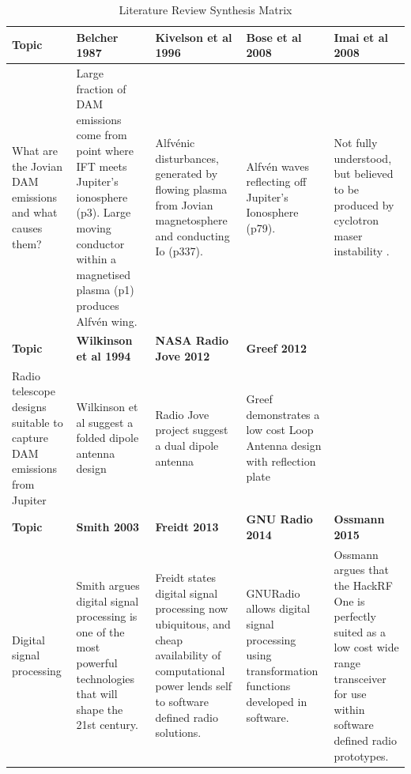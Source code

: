 %
\begin{table}
  \centering
  \begin{tabular}{ | p{2.5cm} || p{2.5cm} | p{2.5cm} | p{2.5cm} | p{2.5cm} |}
    \hline
    \textbf{Topic} & \textbf{Belcher 1987} & \textbf{Kivelson et al 1996} & \textbf{Bose et al 2008} & \textbf{Imai et al 2008} \\ \hline \hline
    What are the Jovian DAM emissions and what causes them? & Large fraction of DAM emissions come from point where IFT meets Jupiter's ionosphere (p3). Large moving conductor within a magnetised plasma (p1) produces Alfv\'en wing. & Alfv\'enic disturbances, generated by flowing plasma from Jovian magnetosphere and conducting Io (p337). & Alfv\'en waves reflecting off Jupiter's Ionosphere (p79). & Not fully understood, but believed to be produced by cyclotron maser instability \citep{imai-08}. \\ \hline \hline

    \textbf{Topic} & \textbf{Wilkinson et al 1994} & \textbf{NASA Radio Jove 2012} & \textbf{Greef 2012} &  \\ \hline \hline

    Radio telescope designs suitable to capture DAM emissions from Jupiter & Wilkinson et al suggest a folded dipole antenna design & Radio Jove project suggest a dual dipole antenna & Greef demonstrates a low cost Loop Antenna design with reflection plate & \\ \hline \hline
    
    \textbf{Topic} & \textbf{Smith 2003} & \textbf{Freidt 2013} & \textbf{GNU Radio 2014} & \textbf{Ossmann 2015} \\ \hline \hline    
    
    Digital signal processing & Smith argues digital signal processing is one of the most powerful technologies that will shape the 21st century. & Freidt states digital signal processing now ubiquitous, and cheap availability of computational power lends self to software defined radio solutions. & GNURadio allows digital signal processing using transformation functions developed in software. & Ossmann argues that the HackRF One is perfectly suited as a low cost wide range transceiver for use within software defined radio prototypes. \\
    \hline
  \end{tabular}
  \caption{Literature Review Synthesis Matrix}
  \label{tab:literature_review_synthesis_matrix}
\end{table}
%